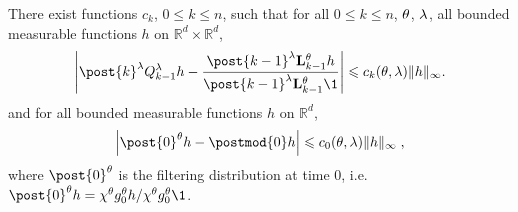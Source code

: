 \documentclass{article}
\newtheorem{remark}{Remark}
\begin{document}

\begin{hypH}
\label{assum:bias:bound}
There exist functions $c_k$, $0\leqslant k \leqslant n$, such that for all $0\leqslant k \leqslant n$, $\theta$, $\lambda$, all bounded measurable functions $h$ on $\mathbb{R}^d\times\mathbb{R}^d$, %
$$
\left|\post{k}^{\parvar}Q_{k-1}^{\parvar} h - \frac{\post{k-1}^{\parvar} \uk{k-1}{\parvec}h}{\post{k-1}^{\parvar} \uk{k-1}{\parvec}\1}\right| \leqslant c_k(\parvec,\parvar) \| h \|_\infty. 
$$ 
and for all bounded measurable functions $h$ on $\mathbb{R}^d$,
$$
\left|\post{0}^{\parvec}h - \postmod{0} h\right|\leqslant c_0(\parvec,\parvar)\|h\|_\infty\eqsp,
$$
where  $\post{0}^{\parvec}$ is the filtering distribution at time $0$, i.e. $\post{0}^{\parvec}h = \chi^\parvec \md{0}{\parvec}h/\chi^\parvec \md{0}{\parvec}\1$.
\end{hypH}
\end{document}
